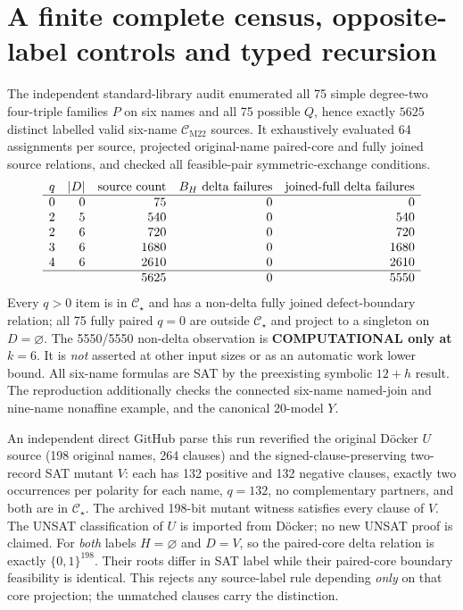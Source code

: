 \documentclass[11pt]{article}
\newcommand{\CM}{\mathcal C_{\mathrm{M22}}}
\newcommand{\CS}{\mathcal C_{\star}}
\begin{document}
\section{A finite complete census, opposite-label controls and typed recursion}
The independent standard-library audit enumerated all 75 simple degree-two four-triple families $P$ on six names and all 75 possible $Q$, hence exactly $5625$ distinct labelled valid six-name $\CM$ sources. It exhaustively evaluated 64 assignments per source, projected original-name paired-core and fully joined source relations, and checked all feasible-pair symmetric-exchange conditions.
\[
\begin{array}{rrrrr}
q & |D| & \text{source count} & B_H\ \text{delta failures} &
\text{joined-full delta failures}\\\hline
0&0&75&0&0\\
2&5&540&0&540\\
2&6&720&0&720\\
3&6&1680&0&1680\\
4&6&2610&0&2610\\\hline
 &&5625&0&5550
\end{array}
\]
Every $q>0$ item is in $\CS$ and has a non-delta fully joined defect-boundary relation; all 75 fully paired $q=0$ are outside $\CS$ and project to a singleton on $D=\varnothing$. The 5550/5550 non-delta observation is \textbf{COMPUTATIONAL only at $k=6$}. It is \emph{not} asserted at other input sizes or as an automatic work lower bound. All six-name formulas are SAT by the preexisting symbolic $12+h$ result. The reproduction additionally checks the connected six-name named-join and nine-name nonaffine example, and the canonical 20-model $Y$.

An independent direct GitHub parse this run reverified the original D\"ocker $U$ source (198 original names, 264 clauses) and the signed-clause-preserving two-record SAT mutant $V$: each has 132 positive and 132 negative clauses, exactly two occurrences per polarity for each name, $q=132$, no complementary partners, and both are in $\CS$. The archived 198-bit mutant witness satisfies every clause of $V$. The UNSAT classification of $U$ is imported from D\"ocker; no new UNSAT proof is claimed. For \emph{both} labels $H=\varnothing$ and $D=V$, so the paired-core delta relation is exactly $\{0,1\}^{198}$. Their roots differ in SAT label while their paired-core boundary feasibility is identical. This rejects any source-label rule depending \emph{only} on that core projection; the unmatched clauses carry the distinction.
\end{document}
